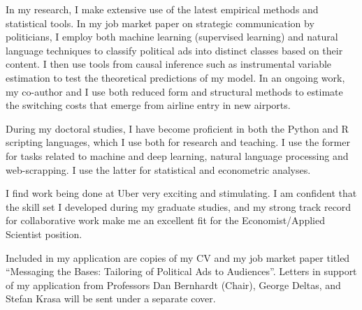 \documentclass[12pt]{letter}
\begin{document}
\begin{letter}{}
In my research, I make extensive use of the latest empirical methods and statistical tools.
In my job market paper on strategic communication by politicians, I employ both machine learning (supervised learning) and natural language techniques to classify political ads into distinct classes based on their content.
I then use tools from causal inference such as instrumental variable estimation to test the theoretical predictions of my model.
In an ongoing work, my co-author and I use both reduced form and structural methods to estimate the switching costs that emerge from airline entry in new airports.

During my doctoral studies, I have become proficient in both the Python and R scripting languages, which I use both for research and teaching.
I use the former for tasks related to machine and deep learning, natural language processing and web-scrapping.
I use the latter for statistical and econometric analyses.

I find work being done at Uber very exciting and stimulating.
I am confident that the skill set I developed during my graduate studies, and my strong track record for collaborative work make me an excellent fit for the Economist/Applied Scientist position.







Included in my application are copies of my CV and my job market paper titled ``Messaging the Bases: Tailoring of Political Ads to Audiences''.
Letters in support of my application from Professors Dan Bernhardt (Chair), George Deltas, and Stefan Krasa will be sent under a separate cover. 


\end{letter}
\end{document}

